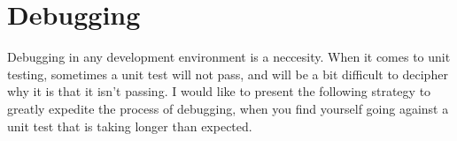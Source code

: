 \maketitle{}
\section{ Debugging }

Debugging in any development environment is a neccesity. When it comes to unit
testing, sometimes a unit test will not pass, and will be a bit difficult to
decipher why it is that it isn't passing. I would like to present the following
strategy to greatly expedite the process of debugging, when you find yourself
going against a unit test that is taking longer than expected. 
